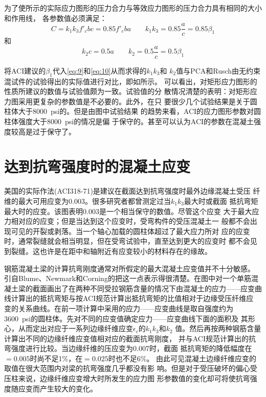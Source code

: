 \documentclass[12pt,a4paper]{book}
\begin{document}
为了使所示的实际应力图形的压力合力与等效应力图形的压力合力具有相同的大小和作用线，
各参数值必须满足：
\begin{equation}
  \label{eq:9}
  C=k_1k_3f'_cbc=0.85f'_cba \qquad k_1k_3=0.85\frac{a}{c}=0.85\beta_1
\end{equation}
和
\begin{equation}
  \label{eq:10}
  k_2c=0.5a \qquad k_2=0.5\frac{a}{c}=0.5\beta_1
\end{equation}

将ACI建议的$\beta_1$代入\cref{eq:9}和\cref{eq:10}从而求得的$k_1k_3$和
$k_2$值与PCA和Rusch由无约束混试件的试验得出的实际值进行对比，即如所示。
可以看出，对矩形应力图形的性质所建议的数值与试验值颇为一致。试验值的分
散情况清楚的表明：对矩形应力图采用更复杂的参数值是不必要的。此外，在只
要很少几个试验结果是关于圆柱体大于\SI{8000}{psi}的。但是由图中试验结果
的趋势来看，ACI的应力图形参数对圆柱体强度大于\SI{8000}{psi}的情况是偏
于保守的。甚至可以认为ACI的参数在混凝土强度较高是过于保守了。

\section{达到抗弯强度时的混凝土应变}

美国的实际作法(ACI318-71)是建议在截面达到抗弯强度时最外边缘混凝土受压
纤维的最大可用应变为0.003。很多研究者都曾测定过当$k_1k_3$最大时或截面
抵抗弯矩最大时的应变。该图表明0.003是一个相当保守的数值。尽管这个应变
大于最大应力相对应的应变；但是当达到这个应变时，受弯构件的受压混凝土一
般都不会出现可见的开裂或剥落。当一个轴心加载的圆柱体超过了最大应力所对
应的应变时，通常裂缝就会相当明显，但在受弯试验中，直至达到更大的应变时
都不会见到裂缝。这也许是在距中和轴附近有应变较小的材料存在的缘故。

钢筋混凝土梁的计算抗弯刚度通常对所假定的最大混凝土应变值并不十分敏感。
引自Blume、Newmark和Corning的把这一点表示得很清楚。在图中对一个单筋混
凝土梁的截面画出了在两种不同受拉钢筋含量的情况下由混凝土的应力——应变曲
线计算出的抵抗弯矩与按ACI规范计算出抵抗弯矩的比值相对于边缘受压纤维应
变的关系曲线。在前一项计算中采用的应力——应变曲线是取自强度约为
\SI{3600}{psi}的圆柱体。先对不同的应变值确定应力——应变曲线下面的面积及
其形心，从而定出对应于一系列边缘纤维应变$\epsilon_c$的$k_1k_3$和$k_2$
值。然后再按两种钢筋含量计算出不同的边缘纤维应变值相对应的截面抗弯刚度，
并与ACI规范计算出的抗弯强度进行比较。当边缘纤维的压应变为0.007时，截面
抵抗弯矩的降低幅度在$=0.005$时尚不足1\%，在$=0.025$时也不足6\%。
由此可见混凝土边缘纤维应变的取值在很大范围内对梁的抗弯强度几乎都没有影
响。但是对于受压破坏的偏心受压柱来说，边缘纤维应变增大时所发生的应力图
形参数值的变化却可将使抗弯强度随应变而产生较大的变化。
\end{document}
